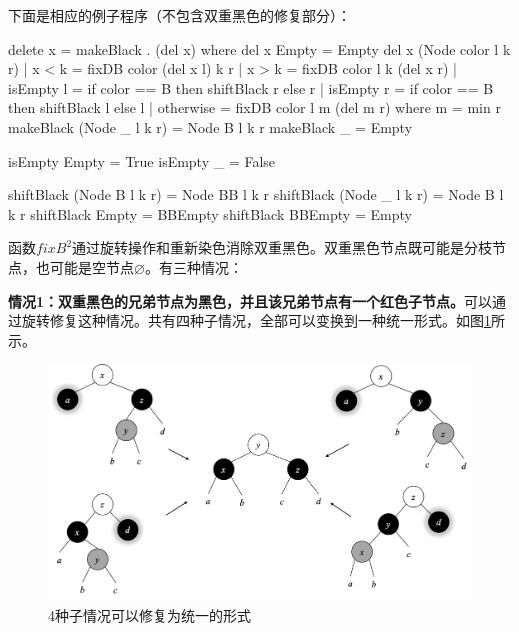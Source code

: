 \documentclass[b5paper]{ctexart}
\begin{document}
下面是相应的例子程序（不包含双重黑色的修复部分）：

\begin{Haskell}
delete x = makeBlack . (del x) where
    del x Empty = Empty
    del x (Node color l k r)
        | x < k = fixDB color (del x l) k r
        | x > k = fixDB color l k (del x r)
        | isEmpty l = if color == B then shiftBlack r else r
        | isEmpty r = if color == B then shiftBlack l else l
        | otherwise = fixDB color l m (del m r) where m = min r
    makeBlack (Node _ l k r) = Node B l k r
    makeBlack _ = Empty

isEmpty Empty = True
isEmpty _ = False

shiftBlack (Node B l k r) = Node BB l k r
shiftBlack (Node _ l k r) = Node B  l k r
shiftBlack Empty = BBEmpty
shiftBlack BBEmpty = Empty
\end{Haskell}

函数$fixB^2$通过旋转操作和重新染色消除双重黑色。双重黑色节点既可能是分枝节点，也可能是空节点$\pmb{\varnothing}$。有三种情况：

\textbf{情况1：双重黑色的兄弟节点为黑色，并且该兄弟节点有一个红色子节点。}可以通过旋转修复这种情况。共有四种子情况，全部可以变换到一种统一形式。如图\ref{fig:del-case1}所示。

\begin{figure}[htbp]
   \centering
   \includegraphics[scale=0.4]{img/del-case1}
   \caption{4种子情况可以修复为统一的形式}
   \label{fig:del-case1}
\end{figure}
\end{document}
